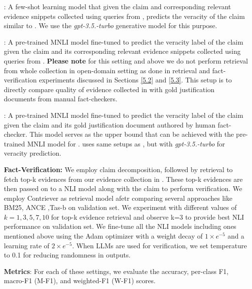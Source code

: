     \textbf{ \gptt{}}: A few-shot learning model that given the claim and corresponding relevant evidence snippets collected using queries from \name{}, predicts the veracity of the claim similar to \cite{quantemp}. We use the \textit{gpt-3.5.-turbo} generative model for this purpose.
    
    \textbf{ \robertaqtempplus{}}: A pre-trained MNLI model fine-tuned to predict the veracity label of the claim given the claim and its corresponding relevant evidence snippets collected using queries from \name{}. \textbf{Please note} for this setting and \gptt{} above we do not perform retrieval from whole collection in open-domain setting as done in retrieval and fact-verification experiments discussed in Sections \ref{5.2} and \ref{5.3}. This setup is  to directly compare quality of evidence collected in \quantempplus{} with gold justification documents from manual fact-checkers.
    
    \textbf{  \robertagold{}}: A pre-trained MNLI model fine-tuned to predict the veracity label of the claim given the claim and its gold justification document authored by human fact-checker. This model serves as the upper bound that can be achieved with the pre-trained MNLI model for \quantempplus{}. 
 \gpttgold{} uses same setups as \robertagold{}, but with \textit{gpt-3.5.-turbo} for veracity prediction.



    \textbf{Fact-Verification:} We employ claim decomposition, followed by retrieval to fetch top-k evidences from our evidence collection in \quantempplus{}. These top-k evidences are then passed on to a NLI model along with the claim to perform verification. We employ Contriever as retrieval model afetr comparing several approaches like BM25, ANCE \cite{ance},Tas-b \cite{tas-b} on validation set.  We experiment with different values of $k=1,3,5,7,10$ for top-k evidence retrieval and observe k=3 to provide best NLI performance on validation set. We fine-tune all the NLI models including ones mentioned above using the Adam optimizer with a weight decay of \( 1\times e^{-5}\) and a learning rate of \(2 \times e^{-5}\). When LLMs are used for verification, we set temperature to 0.1 for reducing randomness in outputs.

    \textbf{Metrics}: For each of these settings, we evaluate the accuracy, per-class F1, macro-F1 (M-F1), and weighted-F1 (W-F1) scores.%

